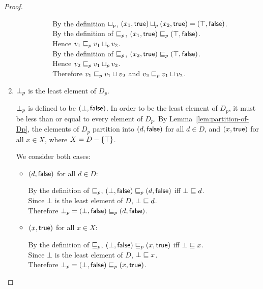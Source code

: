\begin{proof}
\begin{enumerate}
\begin{enumerate}
\begin{itemize}
\begin{itemize}
              By the definition $ \sqcup_p $, $(x_1, \textsf{true})  \sqcup_p  (x_2, \textsf{true}) = (\top, \textsf{false})$. \\ 
              By the definition of $\sqsubseteq_p$, $(x_1, \textsf{true}) \sqsubseteq_p (\top, \textsf{false})$. \\
              Hence $v_1 \sqsubseteq_p v_1 \sqcup_p v_2$. \\ 
              By the definition of $\sqsubseteq_p$, $(x_2, \textsf{true}) \sqsubseteq_p (\top, \textsf{false})$. \\
              Hence $v_2 \sqsubseteq_p v_1 \sqcup_p v_2$. \\ 
              Therefore $v_1 \sqsubseteq_p v_1  \sqcup  v_2$ and $v_2 \sqsubseteq_p v_1  \sqcup  v_2$. 
          \end{itemize}
    \end{itemize}
  \end{enumerate}

\item $\bot_{p}$ is the least element of $D_p$. 

$\bot_{p}$ is defined to be $(\bot, \textsf{false})$.  In order to be the
  least element of $D_p$, it must be less than or equal to every
  element of $D_p$.  By Lemma~\ref{lem:partition-of-Dp}, the elements
  of $D_p$ partition into $(d, \textsf{false})$ for all $d \in D$, and
  $(x, \textsf{true})$ for all $x \in X$, where $X = D - \left\{\top\right\}$.

  We consider both cases:

  \begin{itemize}
  \item $(d, \textsf{false})$ for all $d \in D$:

  By the definition of $\sqsubseteq_p$, $(\bot, \textsf{false}) \sqsubseteq_p (d, \textsf{false})$ iff $\bot \sqsubseteq d$. \\
  Since $\bot$ is the least element of $D$, $\bot \sqsubseteq d$. \\
  Therefore $\bot_{p} = (\bot, \textsf{false}) \sqsubseteq_p (d, \textsf{false})$.

  \item $(x, \textsf{true})$ for all $x \in X$:

  By the definition of $\sqsubseteq_p$, $(\bot, \textsf{false}) \sqsubseteq_p (x, \textsf{true})$ iff $\bot \sqsubseteq x$. \\
  Since $\bot$ is the least element of $D$, $\bot \sqsubseteq x$. \\
  Therefore $\bot_{p} = (\bot, \textsf{false}) \sqsubseteq_p (x, \textsf{true})$.


\end{itemize}
\end{enumerate}
\end{proof}
